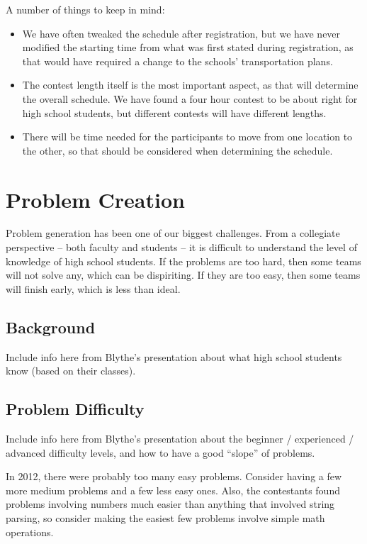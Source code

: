 \documentclass[11pt,twoside,letterpaper]{book}
\newenvironment{itemlist}{
\begin{itemize}
\setlength{\itemsep}{0pt}
\setlength{\parskip}{0pt}}
{\end{itemize}}
\begin{document}
\noindent A number of things to keep in mind:

\begin{itemlist}
  \item We have often tweaked the schedule after registration, but we
    have never modified the starting time from what was first stated
    during registration, as that would have required a change to the
    schools' transportation plans.
  \item The contest length itself is the most important aspect, as
    that will determine the overall schedule.  We have found a four
    hour contest to be about right for high school students, but
    different contests will have different lengths.
  \item There will be time needed for the participants to move from
    one location to the other, so that should be considered when
    determining the schedule.
\end{itemlist}


\cleardoublepage
\chapter{Problem Creation}

Problem generation has been one of our biggest challenges.  From a
collegiate perspective -- both faculty and students -- it is difficult
to understand the level of knowledge of high school students.  If the
problems are too hard, then some teams will not solve any, which can
be dispiriting.  If they are too easy, then some teams will finish
early, which is less than ideal.

\section{Background}

Include info here from Blythe's presentation about what high school
students know (based on their classes).


\section{Problem Difficulty}

Include info here from Blythe's presentation about the beginner /
experienced / advanced difficulty levels, and how to have a good
``slope'' of problems.

In 2012, there were probably too many easy problems. Consider having a
few more medium problems and a few less easy ones. Also, the
contestants found problems involving numbers much easier than anything
that involved string parsing, so consider making the easiest few
problems involve simple math operations.
\end{document}
